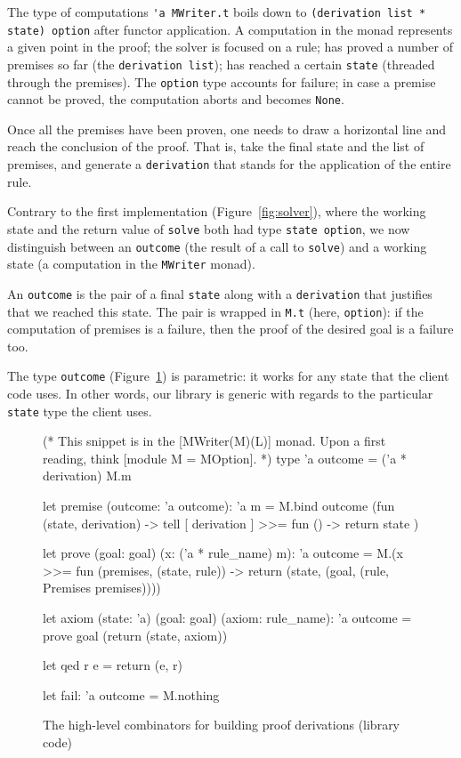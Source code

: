 \documentclass{easychair}
\def\li{\lstinline}
\newcommand{\fref}[1]{Figure~\ref{fig:#1}}
\begin{document}
The type of computations \li+'a MWriter.t+ boils down to \li+(derivation list * state) option+
after functor application. A computation in the monad
represents a given point in the proof; the solver is focused on a rule; has
proved a number of premises so far (the \li+derivation list+); has reached a
certain \li+state+ (threaded through the premises). The \li+option+ type
accounts for failure; in case a premise cannot be proved, the computation aborts
and becomes \li+None+.

Once all the premises have been proven, one needs to draw a horizontal line and
reach the conclusion of the proof. That is, take the final state and the list of
premises, and generate a \li+derivation+ that stands for the application of the
entire rule.

Contrary to the first implementation (\fref{solver}), where the working state
and the return value of \li+solve+ both had type \li+state option+, we now
distinguish between an \li+outcome+ (the result of a call to \li+solve+) and a
working state (a computation in the \li+MWriter+ monad).

An \li+outcome+ is the pair of a final \li+state+ along
with a \li+derivation+ that justifies that we reached this state. The pair is
wrapped in \li+M.t+ (here, \li+option+): if the computation of premises is a
failure, then the proof of the desired goal is a failure too.

The type \li+outcome+ (\fref{combinators}) is parametric: it works for any
state that the client code uses. In other words, our library is generic with
regards to the particular \li+state+ type the client uses.

\begin{figure}
  \centering
\begin{ocaml}
(* This snippet is in the [MWriter(M)(L)] monad. Upon a first reading, think
   [module M = MOption]. *)
type 'a outcome = ('a * derivation) M.m

let premise (outcome: 'a outcome): 'a m =
  M.bind outcome (fun (state, derivation) ->
    tell [ derivation ] >>= fun () ->
    return state
  )

let prove (goal: goal) (x: ('a * rule_name) m): 'a outcome =
  M.(x >>= fun (premises, (state, rule)) ->
    return (state, (goal, (rule, Premises premises))))

let axiom (state: 'a) (goal: goal) (axiom: rule_name): 'a outcome =
  prove goal (return (state, axiom))

let qed r e =
  return (e, r)

let fail: 'a outcome =
  M.nothing
\end{ocaml}
  \caption{The high-level combinators for building proof derivations (library
  code)}
  \label{fig:combinators}
\end{figure}
\end{document}
